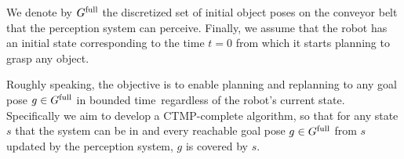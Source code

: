 \documentclass[a4paper]{report}
\begin{document}
%
We denote by $G^{\textrm{full}}$ the discretized set of initial object poses on the conveyor belt that the perception system can perceive.
%
Finally, we assume that the robot has an initial state \Shome corresponding to the time $t=0$ from which it starts planning to grasp any object.


Roughly speaking, the objective is to enable planning and replanning to any goal pose $ g \in G^{\textrm{full}}$ in bounded time~\Tbound regardless of the robot's current state.
%
%
%
%
Specifically we aim to develop a CTMP-complete algorithm, so that 
for any state $s$ that the system can be in 
and every reachable goal pose $g \in G^{\textrm{full}}$ from $s$ updated by the perception system,
$g$ is covered by $s$.
\end{document}
